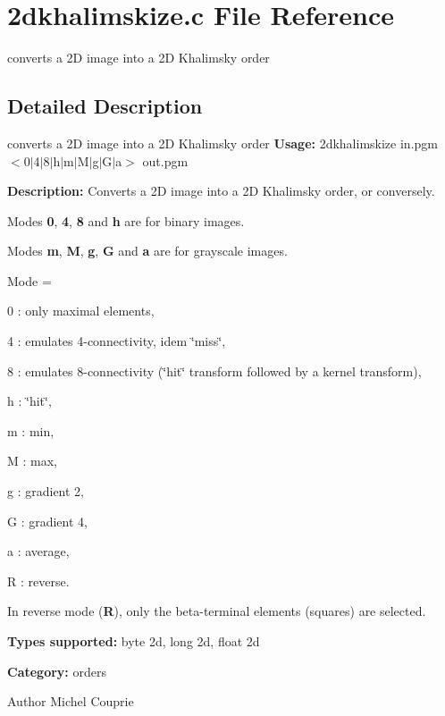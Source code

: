 \section{2dkhalimskize.c File Reference}
\label{2dkhalimskize_8c}


converts a 2D image into a 2D Khalimsky order  




\subsection{Detailed Description}
converts a 2D image into a 2D Khalimsky order {\bfseries Usage:} 2dkhalimskize in.pgm $<$0$|$4$|$8$|$h$|$m$|$M$|$g$|$G$|$a$>$ out.pgm

{\bfseries Description:} Converts a 2D image into a 2D Khalimsky order, or conversely.

Modes {\bfseries 0}, {\bfseries 4}, {\bfseries 8} and {\bfseries h} are for binary images.

Modes {\bfseries m}, {\bfseries M}, {\bfseries g}, {\bfseries G} and {\bfseries a} are for grayscale images.

Mode = \begin{DoxyItemize}
\item 0 : only maximal elements, \item 4 : emulates 4-\/connectivity, idem \char`\"{}miss\char`\"{}, \item 8 : emulates 8-\/connectivity (\char`\"{}hit\char`\"{} transform followed by a kernel transform), \item h : \char`\"{}hit\char`\"{}, \item m : min, \item M : max, \item g : gradient 2, \item G : gradient 4, \item a : average, \item R : reverse.\end{DoxyItemize}
In reverse mode ({\bfseries R}), only the beta-\/terminal elements (squares) are selected.

{\bfseries Types supported:} byte 2d, long 2d, float 2d

{\bfseries Category:} orders

\begin{DoxyAuthor}{Author}
Michel Couprie 
\end{DoxyAuthor}
